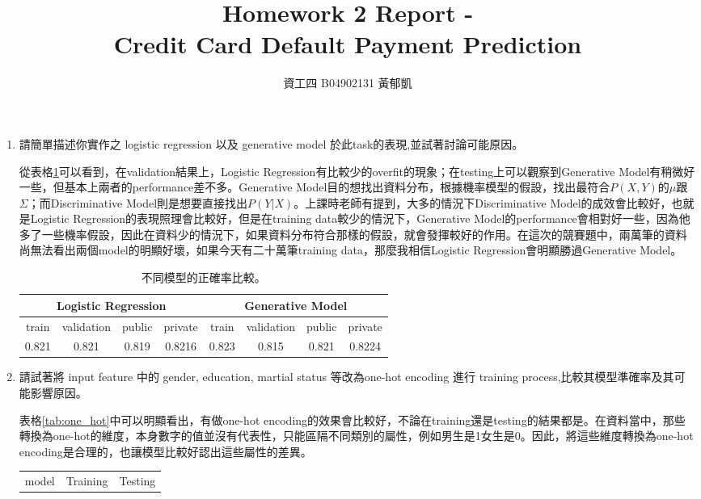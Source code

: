 \documentclass[12pt, a4paper]{article}
\author{資工四 B04902131 黃郁凱}
\title{\vspace{-2cm} Homework 2 Report - \\Credit Card Default Payment Prediction}
\begin{document}
\maketitle

\begin{enumerate}
\item 請簡單描述你實作之 logistic regression 以及 generative model 於此task的表現,並試著討論可能原因。\par
從表格\ref{tab:lr_gm}可以看到，在validation結果上，Logistic Regression有比較少的overfit的現象；在testing上可以觀察到Generative Model有稍微好一些，但基本上兩者的performance差不多。Generative Model目的想找出資料分布，根據機率模型的假設，找出最符合$P(X,Y)$的$\mu$跟$\Sigma$；而Discriminative Model則是想要直接找出$P(Y\vert X)$。上課時老師有提到，大多的情況下Discriminative Model的成效會比較好，也就是Logistic Regression的表現照理會比較好，但是在training data較少的情況下，Generative Model的performance會相對好一些，因為他多了一些機率假設，因此在資料少的情況下，如果資料分布符合那樣的假設，就會發揮較好的作用。在這次的競賽題中，兩萬筆的資料尚無法看出兩個model的明顯好壞，如果今天有二十萬筆training data，那麼我相信Logistic Regression會明顯勝過Generative Model。
\begin{table}[ht]
    \centering
    \begin{tabular}{|c|c|c|c|c|c|c|c|}\hline
        \multicolumn{4}{|c|}{Logistic Regression}&\multicolumn{4}{|c|}{Generative Model}\\\hline
        train&validation&public&private&train&validation&public&private\\\hline
        0.821&0.821&0.819&0.8216&0.823&0.815&0.821&0.8224\\\hline
    \end{tabular}
    \caption{不同模型的正確率比較。}
    \label{tab:lr_gm}
\end{table}
\item 請試著將 input feature 中的 gender, education, martial status 等改為one-hot encoding 進行 training process,比較其模型準確率及其可能影響原因。\par
表格\ref{tab:one_hot}中可以明顯看出，有做one-hot encoding的效果會比較好，不論在training還是testing的結果都是。在資料當中，那些轉換為one-hot的維度，本身數字的值並沒有代表性，只能區隔不同類別的屬性，例如男生是1女生是0。因此，將這些維度轉換為one-hot encoding是合理的，也讓模型比較好認出這些屬性的差異。
\begin{table}[ht]
    \centering
    \begin{tabular}{|l|c|c|c|c|}\hline
        \multirow{2}{*}{model}&\multicolumn{2}{|c|}{Training}&\multicolumn{2}{|c|}{Testing}\\\cline{2-5}

\end{tabular}
\end{table}
\end{enumerate}
\end{document}
